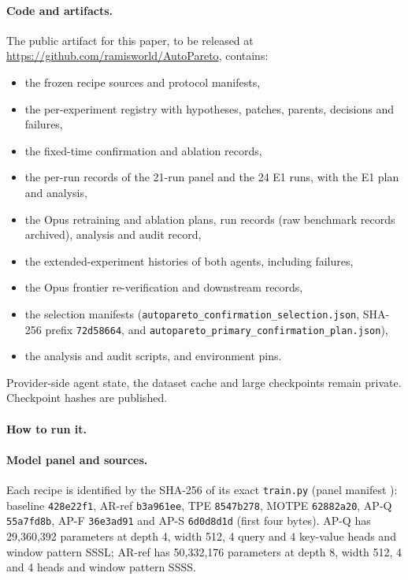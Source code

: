 \documentclass{article}
\newif\ifshowhumanmarkers \showhumanmarkersfalse
\newcommand{\releasepending}{\ifshowhumanmarkers{\color{humanframe}\sffamily\scriptsize\bfseries[RELEASE PENDING]}\ \fi}
\begin{document}
\paragraph{Code and artifacts.} \releasepending The public artifact for this paper, to be released at \url{https://github.com/ramisworld/AutoPareto}, contains:
{\setlength{\leftmargini}{1.2em}\begin{itemize}\setlength{\itemsep}{0pt}\setlength{\parskip}{0pt}\setlength{\topsep}{2pt}
\item the frozen recipe sources and protocol manifests,
\item the per-experiment registry with hypotheses, patches, parents, decisions and failures,
\item the fixed-time confirmation and ablation records,
\item the per-run records of the 21-run panel and the 24 E1 runs, with the E1 plan and analysis,
\item the Opus retraining and ablation plans, run records (raw benchmark records archived), analysis and audit record,
\item the extended-experiment histories of both agents, including failures,
\item the Opus frontier re-verification and downstream records,
\item the selection manifests (\texttt{autopareto\_confirmation\_selection.json}, SHA-256 prefix \texttt{72d58664}, and \texttt{autopareto\_primary\_confirmation\_plan.json}),
\item the analysis and audit scripts, and environment pins.
\end{itemize}}
Provider-side agent state, the dataset cache and large checkpoints remain private. Checkpoint hashes are published.

\paragraph{How to run it.}\label{app:howto} 

\paragraph{Model panel and sources.} Each recipe is identified by the SHA-256 of its exact \texttt{train.py} (panel manifest ): baseline \texttt{428e22f1}, AR-ref \texttt{b3a961ee}, TPE \texttt{8547b278}, MOTPE \texttt{62882a20}, AP-Q \texttt{55a7fd8b}, AP-F \texttt{36e3ad91} and AP-S \texttt{6d0d8d1d} (first four bytes). AP-Q has 29,360,392 parameters at depth 4, width 512, 4 query and 4 key-value heads and window pattern SSSL; AR-ref has 50,332,176 parameters at depth 8, width 512, 4 and 4 heads and window pattern SSSS.
\end{document}
